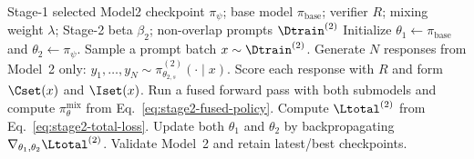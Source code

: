 \begin{algorithm}[t]
\caption{Stage-2 Model2-Rollout Fused-Loss WDL-SFT}
\label{alg:stage2-model2-rollout}
\begin{algorithmic}[1]
\Require Stage-1 selected Model2 checkpoint $\pi_{\psi}$; base model $\pi_{\mathrm{base}}$; verifier $R$; mixing weight $\lambda$; Stage-2 beta $\beta_2$; non-overlap prompts $\Dtrain^{(2)}$
\State Initialize $\theta_1\leftarrow \pi_{\mathrm{base}}$ and $\theta_2\leftarrow \pi_{\psi}$.
    \State Sample a prompt batch $x\sim\Dtrain^{(2)}$.
        \State Generate $N$ responses from Model~2 only:
        $y_1,\ldots,y_N\sim\pi_{\theta_{2,s}}^{(2)}(\cdot\mid x)$.
        \State Score each response with $R$ and form $\Cset(x)$ and $\Iset(x)$.
    \EndFor
    \State Run a fused forward pass with both submodels and compute $\pi_{\theta}^{\mathrm{mix}}$ from Eq.~\eqref{eq:stage2-fused-policy}.
    \State Compute $\Ltotal^{(2)}$ from Eq.~\eqref{eq:stage2-total-loss}.
    \State Update both $\theta_1$ and $\theta_2$ by backpropagating $\nabla_{\theta_1,\theta_2}\Ltotal^{(2)}$.
    \State Validate Model~2 and retain latest/best checkpoints.
\EndFor
\end{algorithmic}
\end{algorithm}

